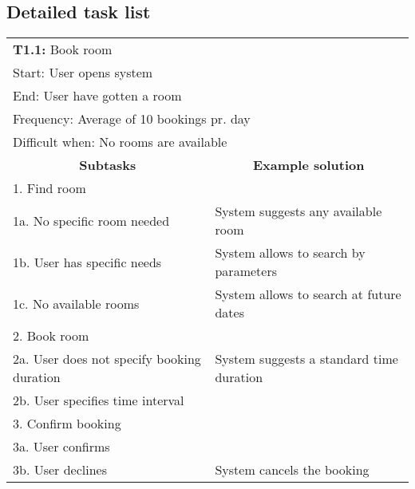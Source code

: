 \subsection*{Detailed task list}
\begin{tabular}{|p{6cm}|p{6cm}|}
\hline 
	\multicolumn{2}{|l|}{\textbf{T1.1:} \hspace{26mm}Book room} \\
	\multicolumn{2}{|l|}{Start: \hspace{26mm}User opens system } \\
	\multicolumn{2}{|l|}{End: \hspace{28mm}User have gotten a room } \\
	\multicolumn{2}{|l|}{Frequency: \hspace{17mm}Average of 10 bookings pr. day} \\
	\multicolumn{2}{|l|}{Difficult when: \hspace{10mm}No rooms are available } \\ \hline
	\multicolumn{1}{|c|}{\textbf{Subtasks}} & \multicolumn{1}{c|}{\textbf{Example solution}} \\ \hline
	1.  Find room & \\
	1a. No specific room needed & System suggests any available room\\
	1b. User has specific needs & System allows to search by parameters\\
	1c. No available rooms & System allows to search at future dates\\ \hline
	2.  Book room & \\
	2a. User does not specify booking duration & System suggests a standard time duration \\
	2b. User specifies time interval & \\ \hline
	3. Confirm booking & \\
	3a. User confirms & \\
	3b. User declines & System cancels the booking \\ \hline
\end{tabular}
\newline
\vspace{1cm}
\newline
